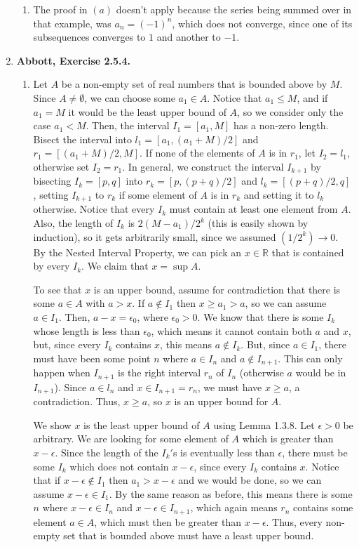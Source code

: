 \documentclass{article}
\newcommand{\R}{\mathbb{R}}
\newcommand{\exc}[2][Abbott]{\item \textbf{#1, Exercise #2.}}
\newcommand{\lep}[1][L]{#1et $\epsilon > 0$ be arbitrary}
\begin{document}
\begin{enumerate}
\begin{enumerate}
        \item The proof in $(a)$ doesn't apply because the series being summed over in that example, was $a_n = (-1)^n$, which does not converge, since one of its subsequences converges to $1$ and another to $-1$.
    \end{enumerate}
    
    \exc{2.5.4}
    \begin{enumerate}
        \item Let $A$ be a non-empty set of real numbers that is bounded above by $M$. Since $A \neq \emptyset$, we can choose some $a_1 \in A$. Notice that $a_1 \leq M$, and if $a_1 = M$ it would be the least upper bound of $A$, so we consider only the case $a_1 < M$. Then, the interval $I_1 =[a_1, M]$ has a non-zero length. Bisect the interval into $l_1 = [a_1, (a_1+M)/2]$ and $r_1 = [(a_1+M)/2, M]$. If none of the elements of $A$ is in $r_1$, let $I_2 = l_1$, otherwise set $I_2 = r_1$. In general, we construct the interval $I_{k+1}$ by bisecting $I_k = [p, q]$ into $r_k=[p, (p+q)/2]$ and $l_k = [(p+q)/2, q]$, setting $I_{k+1}$ to $r_k$ if some element of $A$ is in $r_k$ and setting it to $l_k$ otherwise. Notice that every $I_k$ must contain at least one element from $A$. Also, the length of $I_k$ is $2 (M-a_1)/2^k$ (this is easily shown by induction), so it gets arbitrarily small, since we assumed $(1/2^k) \to 0$. By the Nested Interval Property, we can pick an $x \in \R$ that is contained by every $I_k$. We claim that $x = \sup A$.
        
        To see that $x$ is an upper bound, assume for contradiction that there is some $a \in A$ with $a > x$. If $a \notin I_1$ then $x \geq a_1 > a$, so we can assume $a \in I_1$. Then, $a-x = \epsilon_0$, where $\epsilon_0 > 0$. We know that there is some $I_k$ whose length is less than $\epsilon_0$, which means it cannot contain both $a$ and $x$, but, since every $I_k$ contains $x$, this means $a \notin I_k$. But, since $a \in I_1$, there must have been some point $n$ where $a \in I_n$ and $a \notin I_{n+1}$. This can only happen when $I_{n+1}$ is the right interval $r_n$ of $I_n$ (otherwise $a$ would be in $I_{n+1}$). Since $a \in l_n$ and $x \in I_{n+1} = r_n$, we must have $x \geq a$, a contradiction. Thus, $x \geq a$, so $x$ is an upper bound for $A$.
        
        We show $x$ is the least upper bound of $A$ using Lemma 1.3.8. \lep. We are looking for some element of $A$ which is greater than $x-\epsilon$. Since the length of the $I_k'$s is eventually less than $\epsilon$, there must be some $I_k$ which does not contain $x-\epsilon$, since every $I_k$ contains $x$. Notice that if $x-\epsilon \notin I_1$ then $a_1 > x-\epsilon$ and we would be done, so we can assume $x-\epsilon \in I_1$. By the same reason as before, this means there is some $n$ where $x-\epsilon \in I_n$ and $x-\epsilon \in I_{n+1}$, which again means $r_n$ contains some element $a \in A$, which must then be greater than $x-\epsilon$. Thus, every non-empty set that is bounded above must have a least upper bound.
        

\end{enumerate}
\end{enumerate}
\end{document}
